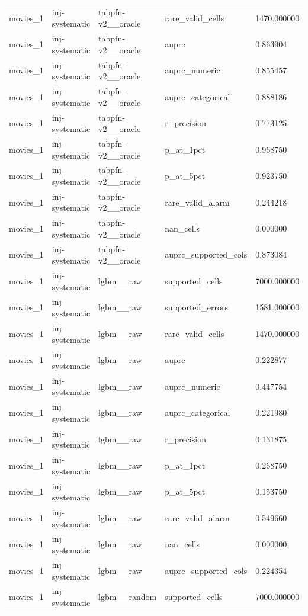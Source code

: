 \begin{tabular}{lllll}
movies\_1 & inj-systematic & tabpfn-v2\_\_oracle & rare\_valid\_cells & 1470.000000 \\
movies\_1 & inj-systematic & tabpfn-v2\_\_oracle & auprc & 0.863904 \\
movies\_1 & inj-systematic & tabpfn-v2\_\_oracle & auprc\_numeric & 0.855457 \\
movies\_1 & inj-systematic & tabpfn-v2\_\_oracle & auprc\_categorical & 0.888186 \\
movies\_1 & inj-systematic & tabpfn-v2\_\_oracle & r\_precision & 0.773125 \\
movies\_1 & inj-systematic & tabpfn-v2\_\_oracle & p\_at\_1pct & 0.968750 \\
movies\_1 & inj-systematic & tabpfn-v2\_\_oracle & p\_at\_5pct & 0.923750 \\
movies\_1 & inj-systematic & tabpfn-v2\_\_oracle & rare\_valid\_alarm & 0.244218 \\
movies\_1 & inj-systematic & tabpfn-v2\_\_oracle & nan\_cells & 0.000000 \\
movies\_1 & inj-systematic & tabpfn-v2\_\_oracle & auprc\_supported\_cols & 0.873084 \\
movies\_1 & inj-systematic & lgbm\_\_raw & supported\_cells & 7000.000000 \\
movies\_1 & inj-systematic & lgbm\_\_raw & supported\_errors & 1581.000000 \\
movies\_1 & inj-systematic & lgbm\_\_raw & rare\_valid\_cells & 1470.000000 \\
movies\_1 & inj-systematic & lgbm\_\_raw & auprc & 0.222877 \\
movies\_1 & inj-systematic & lgbm\_\_raw & auprc\_numeric & 0.447754 \\
movies\_1 & inj-systematic & lgbm\_\_raw & auprc\_categorical & 0.221980 \\
movies\_1 & inj-systematic & lgbm\_\_raw & r\_precision & 0.131875 \\
movies\_1 & inj-systematic & lgbm\_\_raw & p\_at\_1pct & 0.268750 \\
movies\_1 & inj-systematic & lgbm\_\_raw & p\_at\_5pct & 0.153750 \\
movies\_1 & inj-systematic & lgbm\_\_raw & rare\_valid\_alarm & 0.549660 \\
movies\_1 & inj-systematic & lgbm\_\_raw & nan\_cells & 0.000000 \\
movies\_1 & inj-systematic & lgbm\_\_raw & auprc\_supported\_cols & 0.224354 \\
movies\_1 & inj-systematic & lgbm\_\_random & supported\_cells & 7000.000000 \\

\end{tabular}
